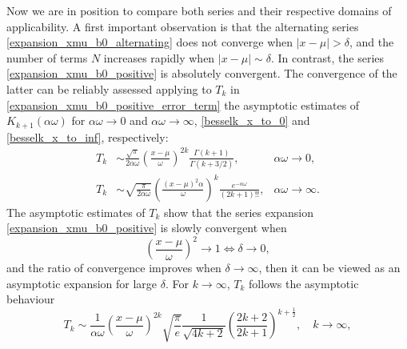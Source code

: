 \documentclass[10pt,a4paper,oneside]{article}
\numberwithin{equation}{section}
\begin{document}
Now we are in position to compare both series and their respective domains of applicability. A first important observation is that the alternating series \eqref{expansion_xmu_b0_alternating} does not converge when $|x - \mu| > \delta$, and the number of terms $N$ increases rapidly when $|x - \mu| \sim \delta$. In contrast, the series \eqref{expansion_xmu_b0_positive} is absolutely convergent. The convergence of the latter can be reliably assessed applying to $T_k$ in \eqref{expansion_xmu_b0_positive_error_term} the asymptotic estimates of $K_{k+1}(\alpha\omega)$ for $\alpha \omega \to 0$ and $\alpha \omega \to \infty$, \eqref{besselk_x_to_0} and \eqref{besselk_x_to_inf}, respectively:
\begin{align*}
T_k &\sim \frac{\sqrt{\pi}}{2\alpha\omega} \left(\frac{x-\mu}{\omega}\right)^{2k}\frac{\Gamma(k + 1)}{\Gamma(k + 3/2)}, & \alpha\omega \to 0,\\
T_k &\sim \sqrt{\frac{\pi}{2\alpha \omega}} \left(\frac{(x-\mu)^2\alpha}{\omega}\right)^k \frac{e^{-\alpha \omega}}{(2k + 1)!!}, &\alpha\omega \to \infty.
\end{align*}
The asymptotic estimates of $T_k$ show that the series expansion \eqref{expansion_xmu_b0_positive} is slowly convergent when
\begin{equation*}
\left(\frac{x-\mu}{\omega}\right)^2 \to 1 \Longleftrightarrow \delta \to 0,
\end{equation*}
and the ratio of convergence improves when $\delta \to \infty$, then it can be viewed as an asymptotic expansion for large $\delta$. For $k \to \infty$, $T_k$ follows the asymptotic behaviour
\begin{equation*}
T_k \sim \frac{1}{\alpha\omega}\left(\frac{x-\mu}{\omega}\right)^{2k}\sqrt{\frac{\pi}{e}}\frac{1}{\sqrt{4k + 2}}\left(\frac{2k + 2}{2k + 1}\right)^{k + \frac{1}{2}}, \quad k \to \infty,
\end{equation*}
\end{document}
